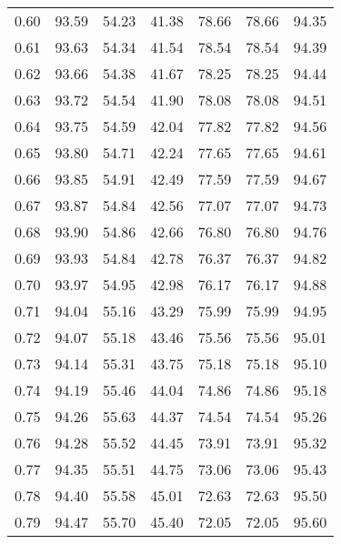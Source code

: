 \begin{tabular}{|c|c|c|c|c|c|c|}
      0.60 &     93.59 &     54.23 &      41.38 &   78.66 &      78.66 &         94.35 \\
      0.61 &     93.63 &     54.34 &      41.54 &   78.54 &      78.54 &         94.39 \\
      0.62 &     93.66 &     54.38 &      41.67 &   78.25 &      78.25 &         94.44 \\
      0.63 &     93.72 &     54.54 &      41.90 &   78.08 &      78.08 &         94.51 \\
      0.64 &     93.75 &     54.59 &      42.04 &   77.82 &      77.82 &         94.56 \\
      0.65 &     93.80 &     54.71 &      42.24 &   77.65 &      77.65 &         94.61 \\
      0.66 &     93.85 &     54.91 &      42.49 &   77.59 &      77.59 &         94.67 \\
      0.67 &     93.87 &     54.84 &      42.56 &   77.07 &      77.07 &         94.73 \\
      0.68 &     93.90 &     54.86 &      42.66 &   76.80 &      76.80 &         94.76 \\
      0.69 &     93.93 &     54.84 &      42.78 &   76.37 &      76.37 &         94.82 \\
      0.70 &     93.97 &     54.95 &      42.98 &   76.17 &      76.17 &         94.88 \\
      0.71 &     94.04 &     55.16 &      43.29 &   75.99 &      75.99 &         94.95 \\
      0.72 &     94.07 &     55.18 &      43.46 &   75.56 &      75.56 &         95.01 \\
      0.73 &     94.14 &     55.31 &      43.75 &   75.18 &      75.18 &         95.10 \\
      0.74 &     94.19 &     55.46 &      44.04 &   74.86 &      74.86 &         95.18 \\
      0.75 &     94.26 &     55.63 &      44.37 &   74.54 &      74.54 &         95.26 \\
      0.76 &     94.28 &     55.52 &      44.45 &   73.91 &      73.91 &         95.32 \\
      0.77 &     94.35 &     55.51 &      44.75 &   73.06 &      73.06 &         95.43 \\
      0.78 &     94.40 &     55.58 &      45.01 &   72.63 &      72.63 &         95.50 \\
      0.79 &     94.47 &     55.70 &      45.40 &   72.05 &      72.05 &         95.60 \\

\end{tabular}
